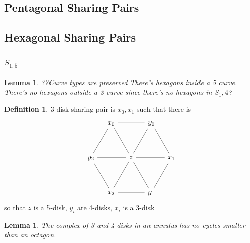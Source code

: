 \documentclass[11pt]{article}
\newtheorem{lemma}[theorem]{Lemma}
\theoremstyle{remark}
\theoremstyle{definition}
\newtheorem{definition}[theorem]{Definition}
\begin{document}
\subsection{  Pentagonal Sharing Pairs }


\subsection{  Hexagonal Sharing Pairs }

\subsubsection{$S_{1,5}$}

\begin{lemma}
  ??Curve types are preserved
  There's hexagons inside a 5 curve.
  There's no hexagons outside a 3 curve since there's no hexagons in $S_1,4$?
\end{lemma}

\begin{definition}
3-disk sharing pair is $x_0,x_1$ such that there is
$$
\begin{tikzcd}[column sep={1cm,between origins}, row sep={1.732050808cm,between origins},every arrow/.append style={dash}]
    & x_0 \arrow[rr] \arrow[rd] \arrow[ld] && y_0 \arrow[rd] \arrow[ld]  &  \\
    y_2 \arrow[rd]\arrow[rr]&  & z \arrow[rr] &  & x_1 \\
    & x_2 \arrow[rr] \arrow[ur] && y_1 \arrow[ru]\arrow[lu] &
\end{tikzcd}
$$
so that $z$ is a 5-disk, $y_i$ are 4-disks, $x_i$ is a 3-disk
\end{definition}

\begin{lemma}
  The complex of 3 and 4-disks in an annulus
  has no cycles smaller than an octagon.
\end{lemma}
\end{document}
